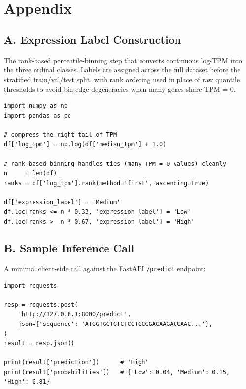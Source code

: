 \documentclass[11pt,a4paper]{article}
\begin{document}
\section*{Appendix}

\subsection*{A. Expression Label Construction}

The rank-based percentile-binning step that converts continuous log-TPM into the three ordinal classes. Labels are assigned across the full dataset before the stratified train/val/test split, with rank ordering used in place of raw quantile thresholds to avoid bin-edge degeneracies when many genes share TPM = 0.

\begin{lstlisting}
import numpy as np
import pandas as pd

# compress the right tail of TPM
df['log_tpm'] = np.log(df['median_tpm'] + 1.0)

# rank-based binning handles ties (many TPM = 0 values) cleanly
n     = len(df)
ranks = df['log_tpm'].rank(method='first', ascending=True)

df['expression_label'] = 'Medium'
df.loc[ranks <= n * 0.33, 'expression_label'] = 'Low'
df.loc[ranks >  n * 0.67, 'expression_label'] = 'High'
\end{lstlisting}

\subsection*{B. Sample Inference Call}

A minimal client-side call against the FastAPI \texttt{/predict} endpoint:

\begin{lstlisting}
import requests

resp = requests.post(
    'http://127.0.0.1:8000/predict',
    json={'sequence': 'ATGGTGCTGTCTCCTGCCGACAAGACCAAC...'},
)
result = resp.json()

print(result['prediction'])      # 'High'
print(result['probabilities'])   # {'Low': 0.04, 'Medium': 0.15, 'High': 0.81}
\end{lstlisting}
\end{document}
